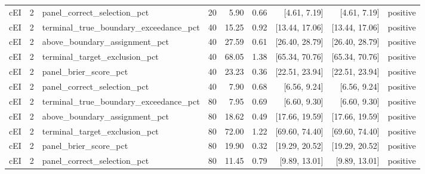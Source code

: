 \begin{longtable}{lllrrrrrl}
cEI & 2 & panel\_correct\_selection\_pct & 20 & 5.90 & 0.66 & [4.61, 7.19] & [4.61, 7.19] & positive \\
cEI & 2 & terminal\_true\_boundary\_exceedance\_pct & 40 & 15.25 & 0.92 & [13.44, 17.06] & [13.44, 17.06] & positive \\
cEI & 2 & above\_boundary\_assignment\_pct & 40 & 27.59 & 0.61 & [26.40, 28.79] & [26.40, 28.79] & positive \\
cEI & 2 & terminal\_target\_exclusion\_pct & 40 & 68.05 & 1.38 & [65.34, 70.76] & [65.34, 70.76] & positive \\
cEI & 2 & panel\_brier\_score\_pct & 40 & 23.23 & 0.36 & [22.51, 23.94] & [22.51, 23.94] & positive \\
cEI & 2 & panel\_correct\_selection\_pct & 40 & 7.90 & 0.68 & [6.56, 9.24] & [6.56, 9.24] & positive \\
cEI & 2 & terminal\_true\_boundary\_exceedance\_pct & 80 & 7.95 & 0.69 & [6.60, 9.30] & [6.60, 9.30] & positive \\
cEI & 2 & above\_boundary\_assignment\_pct & 80 & 18.62 & 0.49 & [17.66, 19.59] & [17.66, 19.59] & positive \\
cEI & 2 & terminal\_target\_exclusion\_pct & 80 & 72.00 & 1.22 & [69.60, 74.40] & [69.60, 74.40] & positive \\
cEI & 2 & panel\_brier\_score\_pct & 80 & 19.90 & 0.32 & [19.29, 20.52] & [19.29, 20.52] & positive \\
cEI & 2 & panel\_correct\_selection\_pct & 80 & 11.45 & 0.79 & [9.89, 13.01] & [9.89, 13.01] & positive \\
\bottomrule
\end{longtable}
